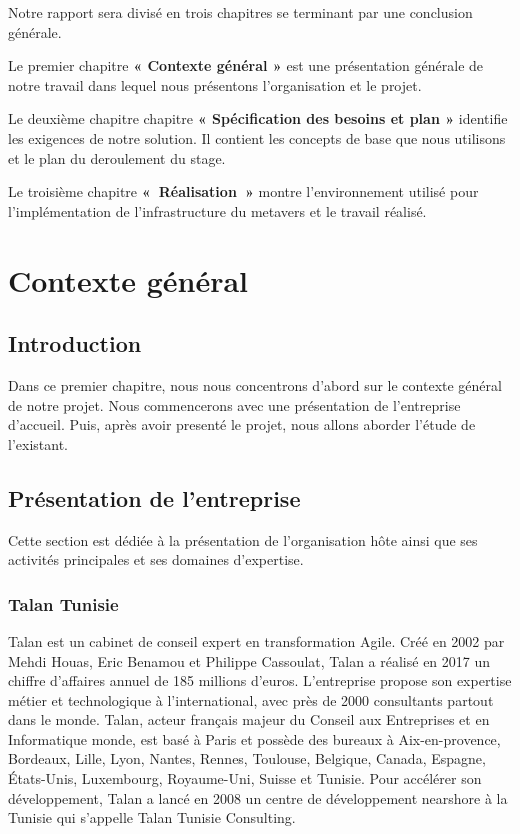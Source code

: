 \documentclass[12pt,a4paper,oneside,french]{book}
\begin{document}
Notre rapport sera divisé en trois chapitres se terminant par une conclusion générale.

Le premier chapitre \textbf{« Contexte général »} est une présentation générale de notre travail dans lequel nous présentons l'organisation et le projet.

Le deuxième chapitre chapitre \textbf{« Spécification des besoins et plan »} identifie les exigences
de notre solution. Il contient les concepts de base que nous utilisons et le plan du deroulement du stage.

Le troisième chapitre \textbf{« Réalisation » } montre l'environnement utilisé pour l'implémentation de l'infrastructure du metavers et le travail réalisé.

\chapter{Contexte général}
\label{ch:1er}
\section*{Introduction}
Dans ce premier chapitre, nous nous concentrons d'abord sur le contexte général de notre projet. Nous commencerons avec une présentation de l'entreprise d'accueil. Puis, après avoir presenté le projet, nous allons
aborder l'étude de l'existant.

\section{Présentation de l'entreprise}
Cette section est dédiée à la présentation de l'organisation hôte ainsi que ses activités principales et ses domaines d'expertise.
\subsection{Talan Tunisie}
Talan \cite{talan} est un cabinet de conseil expert en transformation Agile. Créé en 2002 par Mehdi Houas, Eric Benamou et Philippe Cassoulat, Talan a réalisé en 2017 un chiffre d'affaires annuel de 185 millions d'euros. \newline L'entreprise propose son expertise métier et technologique à l'international, avec près de 2000 consultants partout dans le monde. Talan, acteur français majeur du Conseil aux Entreprises et en Informatique
monde, est basé à Paris et possède des bureaux à Aix-en-provence, Bordeaux, Lille, Lyon, Nantes,
Rennes, Toulouse, Belgique, Canada, Espagne, États-Unis, Luxembourg, Royaume-Uni, Suisse et Tunisie.
Pour accélérer son développement, Talan a lancé en 2008 un centre de développement nearshore à
la Tunisie qui s'appelle Talan Tunisie Consulting.
\end{document}
